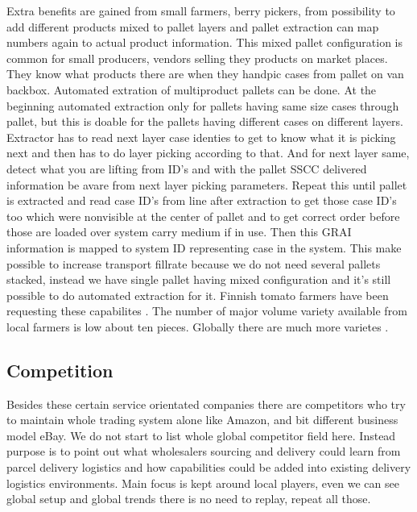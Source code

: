 Extra benefits are gained from small farmers, berry pickers, from possibility
to add different products mixed to pallet layers and pallet extraction can map
numbers again to actual product information. This mixed pallet configuration
is common for small producers, vendors selling they products on market places.
They know what products there are when they handpic cases from pallet on van
backbox. Automated extration of multiproduct pallets can be done. At the
beginning automated extraction only for pallets having same size cases
through pallet, but this is doable for the pallets having different cases on
different layers. Extractor has to read next layer case identies to get to
know what it is picking next and then has to do layer picking according
to that. And for next layer same, detect what you are lifting from ID's and
with the pallet SSCC delivered information be avare from next layer picking
parameters. Repeat this until pallet is extracted and read case ID's from line
after extraction to get those case ID's too which were nonvisible at the center
of pallet and to get correct order before those are loaded over system carry
medium if in use. Then this GRAI information is mapped to system ID
representing case in the system. This make possible to increase transport
fillrate because we do not need several pallets stacked, instead we have single
pallet having mixed configuration and it's still possible to do automated
extraction for it. Finnish tomato farmers have been requesting these
capabilites \cite{WaterBalls}. The number of major volume variety available
from local farmers is low about ten pieces. Globally there are much more
varietes \cite{PlantVariety}.

\subsection{Competition}
\label{competition}
Besides these certain service orientated companies there are competitors who
try to maintain whole trading system alone like Amazon\cite{Amazon}, and bit
different business model eBay\cite{eBay}. We do not start to list whole global
competitor field here. Instead purpose is to point out what wholesalers
sourcing and delivery could learn from parcel delivery logistics and how
capabilities could be added into existing delivery logistics environments.
Main focus is kept around local players, even we can see global setup and global
trends there is no need to replay, repeat all those.

